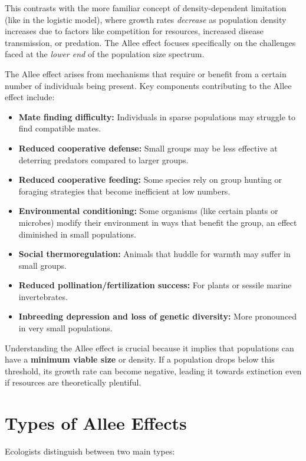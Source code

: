 \documentclass{article}
\begin{document}
This contrasts  with the more familiar concept of density-dependent limitation (like in the logistic model), where growth rates \emph{decrease} as population density increases due to factors like competition for resources, increased disease transmission, or predation. The Allee effect focuses specifically on the challenges faced at the \emph{lower end} of the population size spectrum.

The Allee effect arises from mechanisms that require or benefit from a certain number of individuals being present. Key components contributing to the Allee effect include:
\begin{itemize}
    \item \textbf{Mate finding difficulty:} Individuals in sparse populations may struggle to find compatible mates.
    \item \textbf{Reduced cooperative defense:} Small groups may be less effective at deterring predators compared to larger groups.
    \item \textbf{Reduced cooperative feeding:} Some species rely on group hunting or foraging strategies that become inefficient at low numbers.
    \item \textbf{Environmental conditioning:} Some organisms (like certain plants or microbes) modify their environment in ways that benefit the group, an effect diminished in small populations.
    \item \textbf{Social thermoregulation:} Animals that huddle for warmth may suffer in small groups.
    \item \textbf{Reduced pollination/fertilization success:} For plants or sessile marine invertebrates.
    \item \textbf{Inbreeding depression and loss of genetic diversity:} More pronounced in very small populations.
\end{itemize}

Understanding the Allee effect is crucial because it implies that populations can have a \textbf{minimum viable size} or density. If a population drops below this threshold, its growth rate can become negative, leading it towards extinction even if resources are theoretically plentiful.

\section{Types of Allee Effects}

Ecologists distinguish between two main types:
\end{document}
